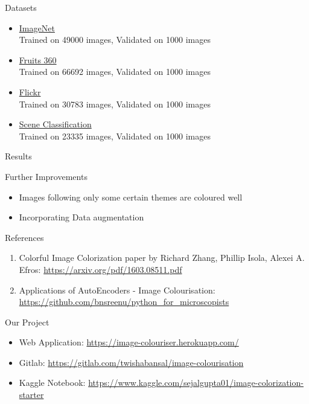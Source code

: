 \documentclass[12pt]{beamer}
\begin{document}
\begin{frame}{Datasets}
	\begin{itemize}
		\item \href{https://www.kaggle.com/lijiyu/imagenet}{ImageNet}\\
			Trained on 49000 images, Validated on 1000 images
		\item \href{https://www.kaggle.com/moltean/fruits}{Fruits 360}\\
			Trained on 66692 images, Validated on 1000 images
		\item \href{https://www.kaggle.com/hsankesara/flickr-image-dataset}{Flickr}\\
			Trained on 30783 images, Validated on 1000 images
		\item \href{https://www.kaggle.com/nitishabharathi/scene-classification}{Scene Classification}\\
			Trained on 23335 images, Validated on 1000 images
	\end{itemize}
\end{frame}

\begin{frame}{Results}
\end{frame}

\begin{frame}{Further Improvements}
	\begin{itemize}
		\item Images following only some certain themes are coloured well
		\item Incorporating Data augmentation
	\end{itemize}
\end{frame}

\begin{frame}{References}
	\begin{enumerate}
		\item Colorful Image Colorization paper by Richard Zhang, Phillip Isola, Alexei A. Efros: \textcolor{cyan}{\href{https://arxiv.org/pdf/1603.08511.pdf}{https://arxiv.org/pdf/1603.08511.pdf}}
		\item Applications of AutoEncoders - Image Colourisation: \textcolor{cyan}{\href{https://github.com/bnsreenu/python\_for\_microscopists}{https://github.com/bnsreenu/python\_for\_microscopists}}
	\end{enumerate}
\end{frame}

\begin{frame}{Our Project}
	\begin{itemize}
		\item Web Application: \textcolor{cyan}{\href{https://image-colouriser.herokuapp.com/}{https://image-colouriser.herokuapp.com/}}
		\item Gitlab: \textcolor{cyan}{\href{https://gitlab.com/twishabansal/image-colourisation}{https://gitlab.com/twishabansal/image-colourisation}}
		\item Kaggle Notebook: \textcolor{cyan}{\href{https://www.kaggle.com/sejalgupta01/image-colorization-starter}{https://www.kaggle.com/sejalgupta01/image-colorization-starter}}
	\end{itemize}
\end{frame}

\begin{frame}[standout]
\end{frame}
\end{document}
